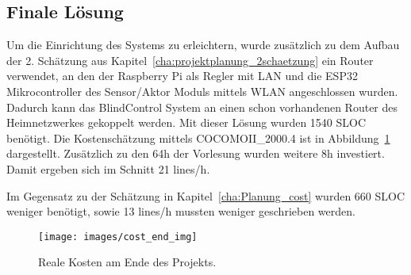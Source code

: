 \subsection{Finale Lösung}
Um die Einrichtung des Systems zu erleichtern, wurde zusätzlich zu dem Aufbau der 2. Schätzung aus Kapitel~\ref{cha:projektplanung_2schaetzung} ein Router verwendet, an den der Raspberry Pi als Regler mit LAN und die ESP32 Mikrocontroller des Sensor/Aktor Moduls mittels WLAN angeschlossen wurden. Dadurch kann das BlindControl System an einen schon vorhandenen Router des Heimnetzwerkes gekoppelt werden. Mit dieser Lösung wurden 1540 SLOC benötigt. Die Kostenschätzung mittels COCOMOII\_2000.4 ist in Abbildung~\ref{fig:cost_end} dargestellt. Zusätzlich zu den 64h der Vorlesung wurden weitere 8h investiert. Damit ergeben sich im Schnitt 21 lines/h. 

Im Gegensatz zu der Schätzung in Kapitel~\ref{cha:Planung_cost} wurden 660 SLOC weniger benötigt, sowie 13 lines/h mussten weniger geschrieben werden.

\begin{figure}[hbt]
	\centering
	\texttt{[image: images/cost\_end\_img]}
	\caption[Kosten Realität]{Reale Kosten am Ende des Projekts.}
	\label{fig:cost_end}
\end{figure}